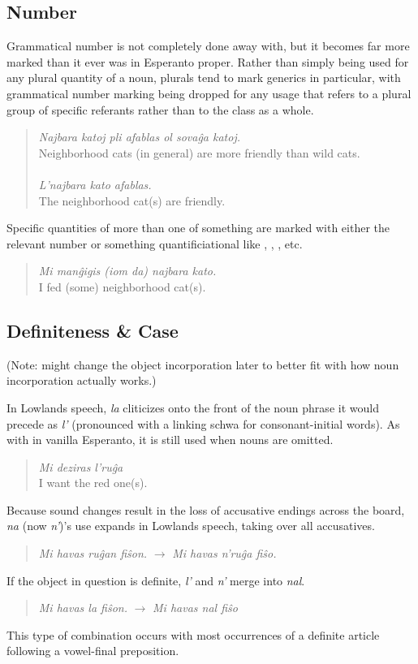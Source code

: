
\subsection{Number}

Grammatical number is not completely done away with, but it becomes far more marked than it ever was in Esperanto proper. Rather than simply being used for any plural quantity of a noun, plurals tend to mark generics in particular, with grammatical number marking being dropped for any usage that refers to a plural group of specific referants rather than to the class as a whole.
\begin{quote}
    \textit{Najbara katoj pli afablas ol sovaĝa katoj.}\\
    Neighborhood cats (in general) are more friendly than wild cats.\\
    \\
    \textit{L'najbara kato afablas.}\\
    The neighborhood cat(s) are friendly.
\end{quote}

Specific quantities of more than one of something are marked with either the relevant number or something quantificiational like , , , etc.
\begin{quote}
    \textit{Mi manĝigis (iom da) najbara kato.}\\
    I fed (some) neighborhood cat(s).
\end{quote}

\subsection{Definiteness \& Case}

(Note: might change the object incorporation later to better fit with how noun incorporation actually works.)

In Lowlands speech, \textit{la} cliticizes onto the front of the noun phrase it would precede as \textit{l'} (pronounced with a linking schwa for consonant-initial words). As with  in vanilla Esperanto, it is still used when nouns are omitted.
\begin{quote}
    \textit{Mi deziras l'ruĝa}\\
    I want the red one(s).
\end{quote}
Because sound changes result in the loss of accusative endings across the board, \textit{na} (now \textit{n'})'s use expands in Lowlands speech, taking over all accusatives.
\begin{quote}
    \textit{Mi havas ruĝan fiŝon.} $\to$ \textit{Mi havas n'ruĝa fiŝo.}
\end{quote}
If the object in question is definite, \textit{l'} and \textit{n'} merge into \textit{nal}.
\begin{quote}
    \textit{Mi havas la fiŝon.} $\to$ \textit{Mi havas nal fiŝo}
\end{quote}
This type of combination occurs with most occurrences of a definite article following a vowel-final preposition.

